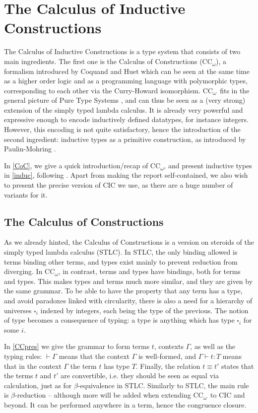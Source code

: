 \documentclass[en]{myarticle}
\newcommand{\uni}[1][]{\square_{#1}}
\newcommand{\conv}{\equiv}
\DeclareMathOperator{\?}{?}
\newcommand{\coc}{CC\textsubscript{$\omega$}}
\begin{document}
{\section{The Calculus of Inductive Constructions}
\label{CIC}

The Calculus of Inductive Constructions is a type system that consists of two main ingredients.
The first one is the Calculus of Constructions (\coc), a formalism introduced by Coquand and Huet \cite{Coquand1988} which can be seen at the same time as a higher order logic and as a programming language with polymorphic types, corresponding to each other via the Curry-Howard isomorphism. \coc\ fits in the general picture of Pure Type Systems \cite{Barendregt1991}, and can thus be seen as a (very strong) extension of the simply typed lambda calculus.
It is already very powerful and expressive enough to encode inductively defined datatypes, for instance integers. However, this encoding is not quite satisfactory, hence the introduction of the second ingredient: inductive types as a primitive construction, as introduced by Paulin-Mohring \cite{Paulin-Mohring1993}.

In \autoref{CoC}, we give a quick introduction/recap of \coc, and present inductive types in \autoref{induc}, following \cite{Paulin-Mohring2015}. Apart from making the report self-contained, we also wish to present the precise version of CIC we use, as there are a huge number of variants for it.


\subsection{The Calculus of Constructions}
\label{CoC}

As we already hinted, the Calculus of Constructions is a version on steroids of the simply typed lambda calculus (STLC). In STLC, the only binding allowed is terms binding other terms, and types exist mainly to prevent reduction from diverging. In \coc, in contrast, terms and types have bindings, both for terms and types. This makes types and terms much more similar, and they are given by the same grammar. To be able to have the property that any term has a type, and avoid paradoxes linked with circularity, there is also a need for a hierarchy of universes $\uni[i]$ indexed by integers, each being the type of the previous. The notion of type becomes a consequence of typing: a type is anything which has type $\uni[i]$ for some $i$.

In \autoref{CCpres} we give the grammar to form terms $t$, contexts $\Gamma$, as well as the typing rules: $\vdash \Gamma$ means that the context $\Gamma$ is well-formed, and $\Gamma \vdash t : T$ means that in the context $\Gamma$ the term $t$ has type $T$. Finally, the relation $t \conv t'$ states that the terms $t$ and $t'$ are convertible, i.e. they should be seen as equal via calculation, just as for $\beta$-equivalence in STLC. Similarly to STLC, the main rule is $\beta$-reduction – although more will be added when extending \coc\ to CIC and beyond. It can be performed anywhere in a term, hence the congruence closure.

}
\end{document}
